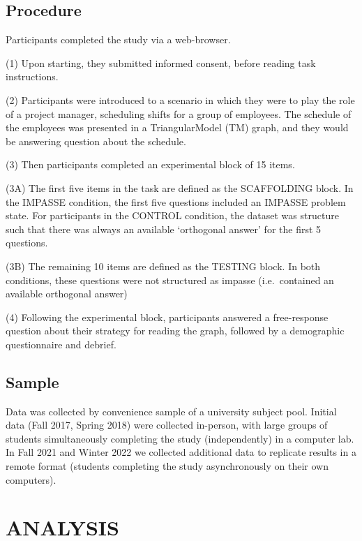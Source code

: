 \documentclass[
  letterpaper,
  DIV=11,
  numbers=noendperiod]{scrreprt}
\begin{document}
\hypertarget{procedure}{%
\subsection{Procedure}\label{procedure}}

Participants completed the study via a web-browser.

(1) Upon starting, they submitted informed consent, before reading task
instructions.

(2) Participants were introduced to a scenario in which they were to
play the role of a project manager, scheduling shifts for a group of
employees. The schedule of the employees was presented in a
TriangularModel (TM) graph, and they would be answering question about
the schedule.

(3) Then participants completed an experimental block of 15 items.

(3A) The first five items in the task are defined as the SCAFFOLDING
block. In the IMPASSE condition, the first five questions included an
IMPASSE problem state. For participants in the CONTROL condition, the
dataset was structure such that there was always an available
`orthogonal answer' for the first 5 questions.

(3B) The remaining 10 items are defined as the TESTING block. In both
conditions, these questions were not structured as impasse
(i.e.~contained an available orthogonal answer)

(4) Following the experimental block, participants answered a
free-response question about their strategy for reading the graph,
followed by a demographic questionnaire and debrief.

\hypertarget{sample}{%
\subsection{Sample}\label{sample}}

Data was collected by convenience sample of a university subject pool.
Initial data (Fall 2017, Spring 2018) were collected in-person, with
large groups of students simultaneously completing the study
(independently) in a computer lab. In Fall 2021 and Winter 2022 we
collected additional data to replicate results in a remote format
(students completing the study asynchronously on their own computers).

\hypertarget{analysis}{%
\section{ANALYSIS}\label{analysis}}
\end{document}

